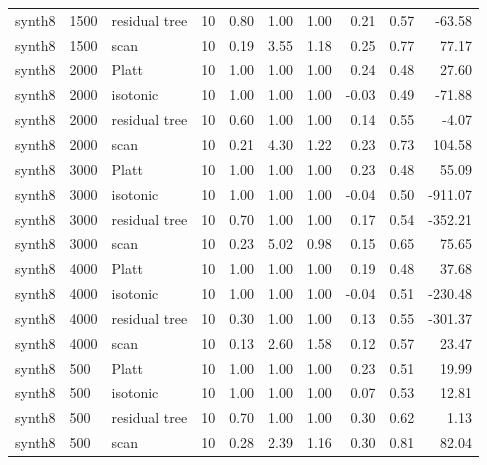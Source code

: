 \begin{tabular}{lllrrrrrrr}
synth8 & 1500 & residual tree & 10 & 0.80 & 1.00 & 1.00 & 0.21 & 0.57 & -63.58 \\
synth8 & 1500 & scan & 10 & 0.19 & 3.55 & 1.18 & 0.25 & 0.77 & 77.17 \\
synth8 & 2000 & Platt & 10 & 1.00 & 1.00 & 1.00 & 0.24 & 0.48 & 27.60 \\
synth8 & 2000 & isotonic & 10 & 1.00 & 1.00 & 1.00 & -0.03 & 0.49 & -71.88 \\
synth8 & 2000 & residual tree & 10 & 0.60 & 1.00 & 1.00 & 0.14 & 0.55 & -4.07 \\
synth8 & 2000 & scan & 10 & 0.21 & 4.30 & 1.22 & 0.23 & 0.73 & 104.58 \\
synth8 & 3000 & Platt & 10 & 1.00 & 1.00 & 1.00 & 0.23 & 0.48 & 55.09 \\
synth8 & 3000 & isotonic & 10 & 1.00 & 1.00 & 1.00 & -0.04 & 0.50 & -911.07 \\
synth8 & 3000 & residual tree & 10 & 0.70 & 1.00 & 1.00 & 0.17 & 0.54 & -352.21 \\
synth8 & 3000 & scan & 10 & 0.23 & 5.02 & 0.98 & 0.15 & 0.65 & 75.65 \\
synth8 & 4000 & Platt & 10 & 1.00 & 1.00 & 1.00 & 0.19 & 0.48 & 37.68 \\
synth8 & 4000 & isotonic & 10 & 1.00 & 1.00 & 1.00 & -0.04 & 0.51 & -230.48 \\
synth8 & 4000 & residual tree & 10 & 0.30 & 1.00 & 1.00 & 0.13 & 0.55 & -301.37 \\
synth8 & 4000 & scan & 10 & 0.13 & 2.60 & 1.58 & 0.12 & 0.57 & 23.47 \\
synth8 & 500 & Platt & 10 & 1.00 & 1.00 & 1.00 & 0.23 & 0.51 & 19.99 \\
synth8 & 500 & isotonic & 10 & 1.00 & 1.00 & 1.00 & 0.07 & 0.53 & 12.81 \\
synth8 & 500 & residual tree & 10 & 0.70 & 1.00 & 1.00 & 0.30 & 0.62 & 1.13 \\
synth8 & 500 & scan & 10 & 0.28 & 2.39 & 1.16 & 0.30 & 0.81 & 82.04 \\
\bottomrule
\end{tabular}

